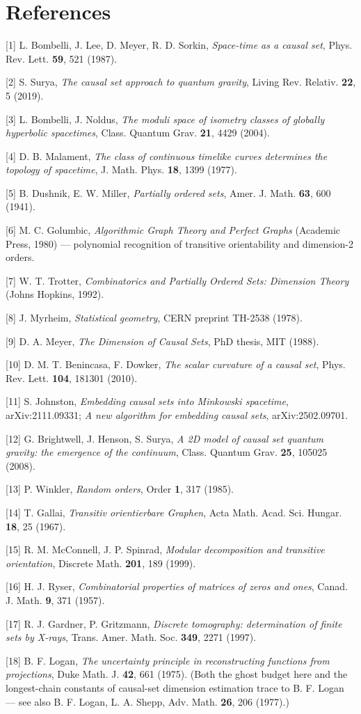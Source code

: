 \documentclass[11pt]{article}
\begin{document}
\section*{References}
[1] L. Bombelli, J. Lee, D. Meyer, R. D. Sorkin, \emph{Space-time as a causal set}, Phys. Rev. Lett. \textbf{59}, 521 (1987).

[2] S. Surya, \emph{The causal set approach to quantum gravity}, Living Rev. Relativ. \textbf{22}, 5 (2019).

[3] L. Bombelli, J. Noldus, \emph{The moduli space of isometry classes of globally hyperbolic spacetimes}, Class. Quantum Grav. \textbf{21}, 4429 (2004).

[4] D. B. Malament, \emph{The class of continuous timelike curves determines the topology of spacetime}, J. Math. Phys. \textbf{18}, 1399 (1977).

[5] B. Dushnik, E. W. Miller, \emph{Partially ordered sets}, Amer. J. Math. \textbf{63}, 600 (1941).

[6] M. C. Golumbic, \emph{Algorithmic Graph Theory and Perfect Graphs} (Academic Press, 1980) — polynomial recognition of transitive orientability and dimension-2 orders.

[7] W. T. Trotter, \emph{Combinatorics and Partially Ordered Sets: Dimension Theory} (Johns Hopkins, 1992).

[8] J. Myrheim, \emph{Statistical geometry}, CERN preprint TH-2538 (1978).

[9] D. A. Meyer, \emph{The Dimension of Causal Sets}, PhD thesis, MIT (1988).

[10] D. M. T. Benincasa, F. Dowker, \emph{The scalar curvature of a causal set}, Phys. Rev. Lett. \textbf{104}, 181301 (2010).

[11] S. Johnston, \emph{Embedding causal sets into Minkowski spacetime}, arXiv:2111.09331; \emph{A new algorithm for embedding causal sets}, arXiv:2502.09701.

[12] G. Brightwell, J. Henson, S. Surya, \emph{A 2D model of causal set quantum gravity: the emergence of the continuum}, Class. Quantum Grav. \textbf{25}, 105025 (2008).

[13] P. Winkler, \emph{Random orders}, Order \textbf{1}, 317 (1985).

[14] T. Gallai, \emph{Transitiv orientierbare Graphen}, Acta Math. Acad. Sci. Hungar. \textbf{18}, 25 (1967).

[15] R. M. McConnell, J. P. Spinrad, \emph{Modular decomposition and transitive orientation}, Discrete Math. \textbf{201}, 189 (1999).

[16] H. J. Ryser, \emph{Combinatorial properties of matrices of zeros and ones}, Canad. J. Math. \textbf{9}, 371 (1957).

[17] R. J. Gardner, P. Gritzmann, \emph{Discrete tomography: determination of finite sets by X-rays}, Trans. Amer. Math. Soc. \textbf{349}, 2271 (1997).

[18] B. F. Logan, \emph{The uncertainty principle in reconstructing functions from projections}, Duke Math. J. \textbf{42}, 661 (1975). (Both the ghost budget here and the longest-chain constants of causal-set dimension estimation trace to B. F. Logan — see also B. F. Logan, L. A. Shepp, Adv. Math. \textbf{26}, 206 (1977).)
\end{document}
